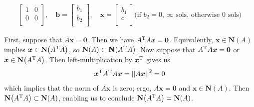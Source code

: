\documentclass[a4paper]{article}
\begin{document}
\begin{align*}
\begin{bmatrix}
		1 & 0 \\
		0 & 0 \\
	\end{bmatrix},
	\quad
	\bm{b} =
	\begin{bmatrix}
		b_{1} \\
		b_{2} \\
	\end{bmatrix},
	\quad
	\bm{x} = 
	\begin{bmatrix}
		b_{1} \\
		c \\
	\end{bmatrix} \text{(if \(b_{2} = 0\), \(\infty\) sols, otherwise 0 sols)}
\end{align*}


First, suppose that \(A \bm{x} = \bm{0}\). Then we have \(A^{\textsc{T}}A \bm{x} = \bm{0}\). Equivalently, \(\bm{x} \in \textbf{N}\!\left( A \right) \) implies \(\bm{x} \in \textbf{N}\!\left( A^{\textsc{T}}A \right) \), so \(\textbf{N}\!\left( A \right) \subset \textbf{N}\!\left( A^{\textsc{T}}A \right) \).  Now suppose that \(A^{\textsc{T}}A \bm{x} = \bm{0}\) or \(\bm{x} \in \textbf{N}\!\left( A^{\textsc{T}}A \right) \). Then left-multiplication by \(\bm{x}^{\textsc{T}}\) gives us
\[
	\bm{x}^{\textsc{T}}A^{\textsc{T}}A \bm{x} = \abs{\abs{A \bm{x}}}^{2} = 0
\]
which implies that the norm of \(A \bm{x}\) is zero; ergo, \(A \bm{x} = \bm{0}\) and \(\bm{x} \in \textbf{N}\!\left( A \right) \). Then \(\textbf{N}\!\left( A^{\textsc{T}}A \right) \subset \textbf{N}\!\left( A \right) \), enabling us to conclude \(\textbf{N}\!\left( A^{\textsc{T}}A \right) = \textbf{N}\!\left( A \right) \). 

\vspace{12pt}

\end{document}
